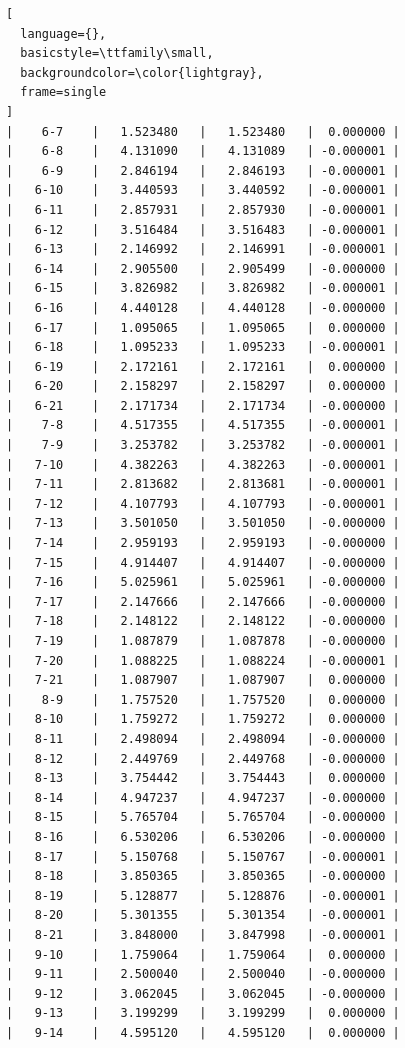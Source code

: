 \documentclass{article}
\begin{document}
\begin{lstlisting}[
  language={},
  basicstyle=\ttfamily\small,
  backgroundcolor=\color{lightgray},
  frame=single
]
|    6-7    |   1.523480   |   1.523480   |  0.000000 |
|    6-8    |   4.131090   |   4.131089   | -0.000001 |
|    6-9    |   2.846194   |   2.846193   | -0.000001 |
|   6-10    |   3.440593   |   3.440592   | -0.000001 |
|   6-11    |   2.857931   |   2.857930   | -0.000001 |
|   6-12    |   3.516484   |   3.516483   | -0.000001 |
|   6-13    |   2.146992   |   2.146991   | -0.000001 |
|   6-14    |   2.905500   |   2.905499   | -0.000000 |
|   6-15    |   3.826982   |   3.826982   | -0.000001 |
|   6-16    |   4.440128   |   4.440128   | -0.000000 |
|   6-17    |   1.095065   |   1.095065   |  0.000000 |
|   6-18    |   1.095233   |   1.095233   | -0.000001 |
|   6-19    |   2.172161   |   2.172161   |  0.000000 |
|   6-20    |   2.158297   |   2.158297   |  0.000000 |
|   6-21    |   2.171734   |   2.171734   | -0.000000 |
|    7-8    |   4.517355   |   4.517355   | -0.000001 |
|    7-9    |   3.253782   |   3.253782   | -0.000001 |
|   7-10    |   4.382263   |   4.382263   | -0.000001 |
|   7-11    |   2.813682   |   2.813681   | -0.000001 |
|   7-12    |   4.107793   |   4.107793   | -0.000001 |
|   7-13    |   3.501050   |   3.501050   | -0.000000 |
|   7-14    |   2.959193   |   2.959193   | -0.000000 |
|   7-15    |   4.914407   |   4.914407   | -0.000000 |
|   7-16    |   5.025961   |   5.025961   | -0.000000 |
|   7-17    |   2.147666   |   2.147666   | -0.000000 |
|   7-18    |   2.148122   |   2.148122   | -0.000000 |
|   7-19    |   1.087879   |   1.087878   | -0.000000 |
|   7-20    |   1.088225   |   1.088224   | -0.000001 |
|   7-21    |   1.087907   |   1.087907   |  0.000000 |
|    8-9    |   1.757520   |   1.757520   |  0.000000 |
|   8-10    |   1.759272   |   1.759272   |  0.000000 |
|   8-11    |   2.498094   |   2.498094   | -0.000000 |
|   8-12    |   2.449769   |   2.449768   | -0.000000 |
|   8-13    |   3.754442   |   3.754443   |  0.000000 |
|   8-14    |   4.947237   |   4.947237   | -0.000000 |
|   8-15    |   5.765704   |   5.765704   | -0.000000 |
|   8-16    |   6.530206   |   6.530206   | -0.000000 |
|   8-17    |   5.150768   |   5.150767   | -0.000001 |
|   8-18    |   3.850365   |   3.850365   | -0.000000 |
|   8-19    |   5.128877   |   5.128876   | -0.000001 |
|   8-20    |   5.301355   |   5.301354   | -0.000001 |
|   8-21    |   3.848000   |   3.847998   | -0.000001 |
|   9-10    |   1.759064   |   1.759064   |  0.000000 |
|   9-11    |   2.500040   |   2.500040   | -0.000000 |
|   9-12    |   3.062045   |   3.062045   | -0.000000 |
|   9-13    |   3.199299   |   3.199299   |  0.000000 |
|   9-14    |   4.595120   |   4.595120   |  0.000000 |

\end{lstlisting}
\end{document}
